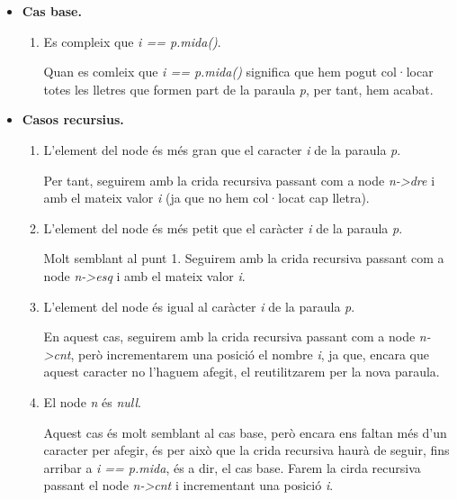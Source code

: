 \documentclass[titlepage]{article}
\begin{document}
\begin{itemize}
    \item \textbf{Cas base.} 
    \begin{enumerate}
        \item Es compleix que \textit{i == p.mida()}. \par
    Quan es comleix que \textit{i == p.mida()} significa que hem pogut col·locar totes les lletres que formen part de la paraula \textit{p}, per tant, hem acabat.
    \newline\par
    \end{enumerate}

    \item \textbf{Casos recursius.} 
    \begin{enumerate}
        \item L'element del node és més gran que el caracter \textit{i} de la paraula \textit{p}. \par
        Per tant, seguirem amb la crida recursiva passant com a node \textit{n->dre} i amb el mateix valor \textit{i} (ja que no hem col·locat cap lletra).
        \item L'element del node és més petit que el caràcter \textit{i} de la paraula \textit{p}. \par
        Molt semblant al punt 1. Seguirem amb la crida recursiva passant com a node \textit{n->esq} i amb el mateix valor \textit{i}.
        \item L'element del node és igual al caràcter \textit{i} de la paraula \textit{p}. \par
        En aquest cas, seguirem amb la crida recursiva passant com a node \textit{n->cnt}, però incrementarem una posició el nombre \textit{i}, ja que, encara que aquest caracter no l'haguem afegit, el reutilitzarem per la nova paraula.
        \item El node \textit{n} és \textit{null}. \par
        Aquest cas és molt semblant al cas base, però encara ens faltan més d'un caracter per afegir, és per això que la crida recursiva haurà de seguir, fins arribar a \textit{i == p.mida}, és a dir, el cas base. Farem la cirda recursiva passant el node \textit{n->cnt} i incrementant una posició \textit{i}.
    \end{enumerate}
\end{itemize}
\end{document}
